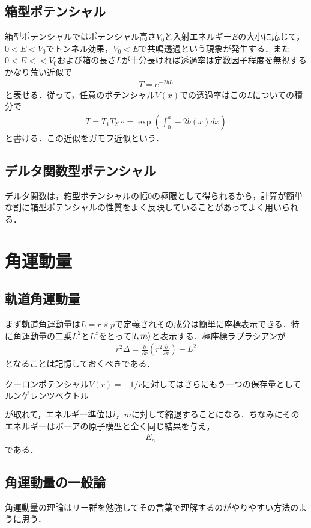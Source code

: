 \documentclass[a4j]{jarticle}
\begin{document}
\subsection{箱型ポテンシャル}
箱型ポテンシャルではポテンシャル高さ$V_0$と入射エネルギー$E$の大小に応じて，$0<E<V_0$でトンネル効果，$V_0<E$で共鳴透過という現象が発生する．また$0<E<<V_0$および箱の長さ$L$が十分長ければ透過率は定数因子程度を無視するかなり荒い近似で
\begin{align*}
 T=e^{-2bL}
\end{align*}
と表せる．従って，任意のポテンシャル$V(x)$での透過率はこの$L$についての積分で
\begin{align*}
 T=T_1T_2\cdots =\exp\left(\int_{0}^{a}-2b(x)dx\right)
\end{align*}
と書ける．この近似をガモフ近似という．


\subsection{デルタ関数型ポテンシャル}
デルタ関数は，箱型ポテンシャルの幅$0$の極限として得られるから，計算が簡単な割に箱型ポテンシャルの性質をよく反映していることがあってよく用いられる．


\section{角運動量}

\subsection{軌道角運動量}
まず軌道角運動量は$L=r\times p$で定義されその成分は簡単に座標表示できる．特に角運動量の二乗$L^2$と$L^z$をとって$\ket{l,m}$と表示する．極座標ラプラシアンが
\begin{align*}
 r^2\Delta =\frac{\partial}{\partial r}\left(r^2\frac{\partial}{\partial r}\right)-L^2
\end{align*}
となることは記憶しておくべきである．

クーロンポテンシャル$V(r)=-1/r$に対してはさらにもう一つの保存量としてルンゲレンツベクトル
\begin{align*}
 =
\end{align*}
が取れて，エネルギー準位は$l$，$m$に対して縮退することになる．ちなみにそのエネルギーはボーアの原子模型と全く同じ結果を与え，
\begin{align*}
 E_n=
\end{align*}
である．

\subsection{角運動量の一般論}
角運動量の理論はリー群を勉強してその言葉で理解するのがやりやすい方法のように思う．
\end{document}

